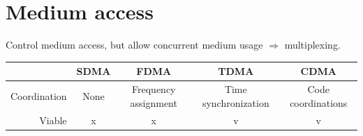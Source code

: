 
\section{Medium access}

Control medium access, but allow concurrent medium usage $\Rightarrow$
multiplexing.

\begin{table}[!h]
    \begin{tabular}{|r|cccc|}
        \hline
        & SDMA & FDMA & TDMA & CDMA \\
        \hline
        Coordination & None & Frequency assignment & Time synchronization & Code coordinations \\
        Viable & x & x & v & v \\
        \hline
    \end{tabular}
\end{table}

